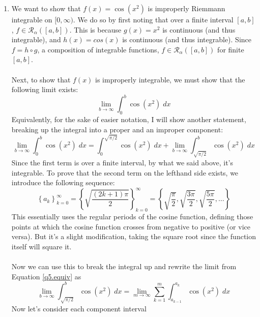 \documentclass[12pt]{article}
\theoremstyle{plain}
\theoremstyle{definition}
\theoremstyle{remark}
\begin{document}
\begin{enumerate}
\newpage
\item We want to show that $f(x) = \cos(x^2)$ is improperly Riemmann integrable on $[0,\infty)$. We do so by first noting that over a finite interval $[a,b]$, $f \in \mathscr{R}_\alpha([a,b])$. This is because $g(x) = x^2$ is continuous (and thus integrable), and $h(x) = cos(x)$ is continuous (and thus integrable).  Since $f = h\circ g$, a composition of integrable functions, $f \in \mathscr{R}_\alpha([a,b])$ for finite $[a,b]$.
\\
\\
Next, to show that $f(x)$ is improperly integrable, we must show that the following limit exists:
\begin{equation}
    \lim_{b\rightarrow\infty} \int^b_0 \cos(x^2) \; dx 
\end{equation} 
Equivalently, for the sake of easier notation, I will show another statement, breaking up the integral into a proper and an improper component:
\begin{equation}
    \label{q5.equiv}
    \lim_{b\rightarrow\infty} \int^b_0 \cos(x^2) \; dx  = 
    \int^{\sqrt{\pi/2}}_0 \cos(x^2) \; dx  + 
    \lim_{b\rightarrow\infty} \int^b_{\sqrt{\pi/2}} \cos(x^2) \; dx  
\end{equation} 
Since the first term is over a finite interval, by what we said above, it's integrable.  To prove that the second term on the lefthand side exists, we introduce the following sequence:
\begin{equation}
    \left\{ a_k \right\}_{k=0}^\infty = 
    \left\{ \sqrt{\frac{\left(2k+1\right)\pi}{2}} \right\}_{k=0}^\infty = 
    \left\{ \sqrt{\frac{\pi}{2}}, 
            \sqrt{\frac{3\pi}{2}},
            \sqrt{\frac{5\pi}{2}}, \ldots
    \right\}
\end{equation}
This essentially uses the regular periods of the cosine function, defining those points at which the cosine function crosses from negative to positive (or vice versa). But it's a slight modification, taking the square root since the function itself will square it.
\\
\\
Now we can use this to break the integral up and rewrite the limit from Equation \ref{q5.equiv} as 
\begin{equation}
    \label{q5.equiv2}
    \lim_{b\rightarrow\infty} \int^b_{\sqrt{\pi/2}} \cos(x^2) \; dx   =
    \lim_{m\rightarrow\infty} \sum^m_{k=1} \int^{a_k}_{a_{k-1}} \cos(x^2) \; dx  
\end{equation}
Now let's consider each component interval

\end{enumerate}
\end{document}
